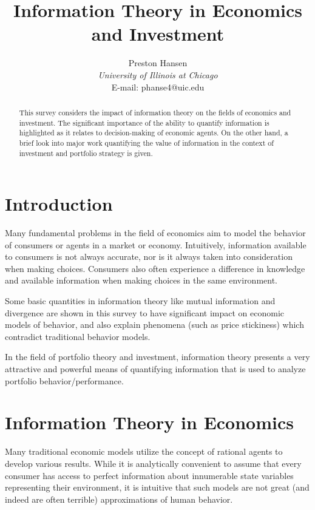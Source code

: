 \documentclass[10pt, twocolumn]{IEEEtran}
\begin{document}
\title{Information Theory in Economics and Investment}
\author{Preston Hansen\\
{\it University of Illinois at Chicago} \\
E-mail: phanse4@uic.edu}
\maketitle

\begin{abstract}
  This survey considers the impact of information theory on the fields of
  economics and investment. The significant importance of the ability to
  quantify information is highlighted as it relates to decision-making of
  economic agents. On the other hand, a brief look into major work
  quantifying the value of information in the context of investment and
  portfolio strategy is given.
\end{abstract}

\section{Introduction}
Many fundamental problems in the field of economics aim to model the behavior of consumers or agents in
a market or economy. Intuitively, information available to consumers is not always accurate, nor is it
always taken into consideration when making choices. Consumers also often experience a difference
in knowledge and available information when making choices in the same environment.

Some basic quantities in information theory like mutual information and divergence are shown in this survey
to have significant impact on economic models of behavior, and also explain phenomena (such as price stickiness)
which contradict traditional behavior models.

In the field of portfolio theory and investment, information theory presents a very attractive and powerful
means of quantifying information that is used to analyze portfolio behavior/performance.

\section{Information Theory in Economics}
Many traditional economic models utilize the concept of rational agents to develop various results.
While it is analytically convenient to assume that every consumer has access to perfect information
about innumerable state variables representing their environment, it is intuitive that such models
are not great (and indeed are often terrible) approximations of human behavior.
\end{document}
